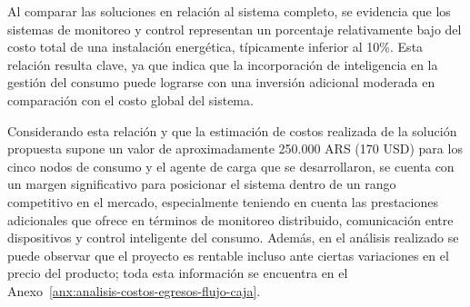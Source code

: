 Al comparar las soluciones en relación al sistema completo, se evidencia que los sistemas de monitoreo y control representan un porcentaje relativamente bajo del costo total de una instalación energética, típicamente inferior al 10\%. Esta relación resulta clave, ya que indica que la incorporación de inteligencia en la gestión del consumo puede lograrse con una inversión adicional moderada en comparación con el costo global del sistema.

Considerando esta relación y que la estimación de costos realizada de la solución propuesta supone un valor de aproximadamente 250.000 ARS (170 USD) para los cinco nodos de consumo y el agente de carga que se desarrollaron, se cuenta con un margen significativo para posicionar el sistema dentro de un rango competitivo en el mercado, especialmente teniendo en cuenta las prestaciones adicionales que ofrece en términos de monitoreo distribuido, comunicación entre dispositivos y control inteligente del consumo. Además, en el análisis realizado se puede observar que el proyecto es rentable incluso ante ciertas variaciones en el precio del producto; toda esta información se encuentra en el Anexo~\ref{anx:analisis-costos-egresos-flujo-caja}.